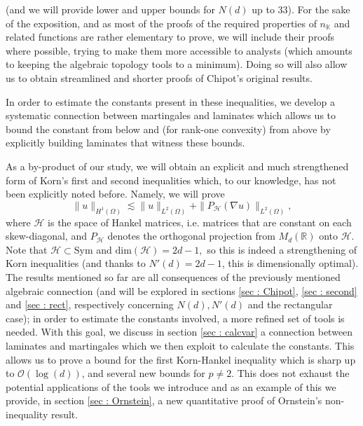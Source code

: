 \documentclass[11pt, a4paper, reqno]{elsarticle}
\theoremstyle{definition}
\theoremstyle{remark}
\begin{document}
(and we will provide lower and upper bounds for $N(d)$ up to $33$).
For the
sake of the exposition, and as most of the proofs of the 
required properties of $n_{\mathbb K}$ and related
functions are rather elementary to prove, we will 
include their proofs where possible,
trying to make them more 
accessible
to analysts (which amounts to  keeping the algebraic topology tools to a 
minimum). Doing so will also allow us to obtain streamlined 
and shorter proofs of Chipot's original results.\par
In order to estimate the constants present in these inequalities, we 
develop a systematic connection between martingales and laminates which allows us
to bound the constant from below and (for rank-one convexity) from above
by explicitly building laminates that witness these bounds.
\par
As a by-product of our study, we will obtain an explicit 
and much strengthened form of Korn's first and second 
inequalities which, to our knowledge, has not been explicitly noted 
before.
Namely,  we will prove
\begin{equation*}
    \|u\|_{H^1(\Omega)}
\lesssim
    \|u\|_{L^2(\Omega)}
+
    \|P_{\mathcal H}(\nabla u)\|_{L^2(\Omega)}, 
\end{equation*}
where $\mathcal H$ is the space of Hankel matrices,
i.e. matrices that are constant on each skew-diagonal, and $P_{\mathcal H}$
denotes the orthogonal projection
from $M_d(\mathbb{R})$ onto $\mathcal H$.
Note that $\mathcal H\subset \mathrm{Sym}$ and 
$\mathrm{dim}(\mathcal H)=2d-1,$ so this is indeed a 
strengthening of Korn inequalities (and thanks to $N'(d)=2d-
1$, this is dimensionally optimal). The results mentioned so far
are all consequences of the previously mentioned algebraic connection (and will be explored in sections \ref{sec : Chipot}, \ref{sec : second}
and \ref{sec : rect}, respectively concerning $N(d), N'(d)$ and the rectangular case);
in order to estimate the constants involved, a more refined set
of tools is needed. With this goal, we discuss in section \ref{sec : calcvar} a connection between laminates and martingales which we then exploit
to calculate the constants. This allows us to prove a bound for the first Korn-Hankel inequality which is sharp up to $\mathcal O(\log(d))$, and several new bounds for $p\neq 2$. This does not exhaust the potential
applications of the tools we introduce and as an example of this we 
provide, in section \ref{sec : Ornstein}, a new quantitative proof 
of Ornstein's non-inequality result.
\end{document}
